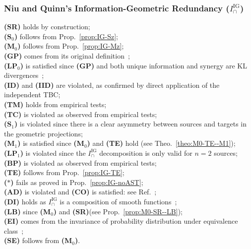 \documentclass{article}
\newcommand{\ts}[1]{\ensuremath{_{\text{#1}}}}
\newcommand{\SR}{\textbf{(SR)}\xspace} %
\newcommand{\Sz}{\textbf{(S\ts{0})}\xspace} %
\newcommand{\Mz}{\textbf{(M\ts{0})}\xspace} %
\newcommand{\GP}{\textbf{(GP)}\xspace} %
\newcommand{\LPz}{\textbf{(LP\ts{0})}\xspace} %
\newcommand{\ID}{\textbf{(ID)}\xspace} %
\newcommand{\IID}{\textbf{(IID)}\xspace} %
\newcommand{\TM}{\textbf{(TM)}\xspace} %
\newcommand{\TC}{\textbf{(TC)}\xspace} %
\newcommand{\So}{\textbf{(S\ts{1})}\xspace} %
\newcommand{\Mo}{\textbf{(M\ts{1})}\xspace} %
\newcommand{\LPo}{\textbf{(LP\ts{1})}\xspace} %
\newcommand{\BP}{\textbf{(BP)}\xspace} %
\newcommand{\TE}{\textbf{(TE)}\xspace} %
\newcommand{\AST}{\textbf{($\boldsymbol{\ast}$)}\xspace} %
\newcommand{\AD}{\textbf{(AD)}\xspace} %
\newcommand{\CO}{\textbf{(CO)}\xspace} %
\newcommand{\LB}{\textbf{(LB)}\xspace} %
\newcommand{\EI}{\textbf{(EI)}\xspace} %
\newcommand{\SE}{\textbf{(SE)}\xspace} %
\newcommand{\DI}{\textbf{(DI)}\xspace}
\newcommand{\IIG}{\ensuremath{I_\cap^{\text{IG}}}\xspace}
\begin{document}
\subsubsection*{Niu and Quinn's Information-Geometric Redundancy ($\IIG$)}
    \SR holds by construction;  \\
    \Sz follows from Prop.~\ref{prop:IG-Sz}; \\
    \Mz follows from Prop.~\ref{prop:IG-Mz}; \\
    \GP comes from its original definition~\cite{niu2019measure}; \\
    \LPz is satisfied since \GP and both unique information and synergy are KL divergences~\cite{niu2019measure}; \\
    \ID and \IID are violated, as confirmed by direct application of the independent TBC;  \\
    \TM holds from empirical tests; \\
    \TC is violated as observed from empirical tests; \\
    \So is violated since there is a clear asymmetry between sources and targets in the geometric projections; \\
    \Mo is satisfied since \Mz and \TE hold (see Theo.~\ref{theo:M0-TE--M1}); \\
    \LPo is violated since the \IIG decomposition is only valid for $n=2$ sources; \\
    \BP is violated as observed from empirical tests; \\
    \TE follows from Prop.~\ref{prop:IG-TE}; \\
    \AST fails as proved in Prop.~\ref{prop:IG-noAST}; \\
    \AD is violated and \CO is satisfied: see Ref.~\cite{rauh2023continuity};  \\
    \DI holds as \IIG is a composition of smooth functions~\cite{rauh2023continuity}; \\
    \LB since \Mz and \SR (see Prop.~\ref{prop:M0-SR--LB}); \\
    \EI comes from the invariance of probability distribution under equivalence class~\cite{li2011connection}; \\
    \SE follows from \Mz.
\end{document}
